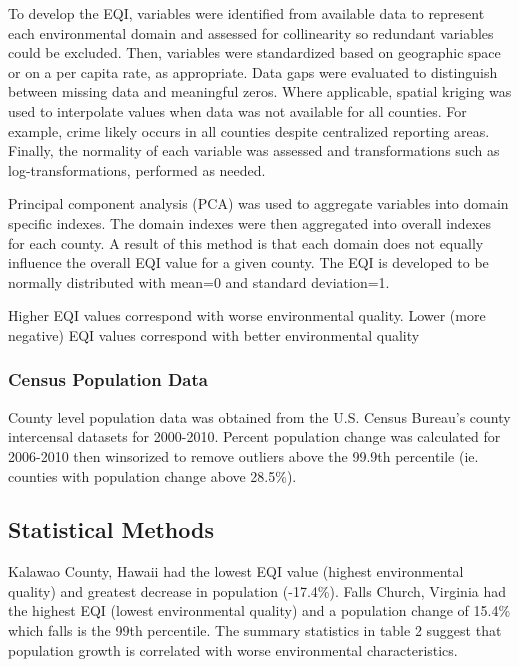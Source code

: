 \documentclass[
]{article}
\begin{document}
To develop the EQI, variables were identified from available data to
represent each environmental domain and assessed for collinearity so
redundant variables could be excluded. Then, variables were standardized
based on geographic space or on a per capita rate, as appropriate. Data
gaps were evaluated to distinguish between missing data and meaningful
zeros. Where applicable, spatial kriging was used to interpolate values
when data was not available for all counties. For example, crime likely
occurs in all counties despite centralized reporting areas. Finally, the
normality of each variable was assessed and transformations such as
log-transformations, performed as needed.

Principal component analysis (PCA) was used to aggregate variables into
domain specific indexes. The domain indexes were then aggregated into
overall indexes for each county. A result of this method is that each
domain does not equally influence the overall EQI value for a given
county. The EQI is developed to be normally distributed with mean=0 and
standard deviation=1.

Higher EQI values correspond with worse environmental quality. Lower
(more negative) EQI values correspond with better environmental quality

\hypertarget{census-population-data}{%
\subsubsection{Census Population Data}\label{census-population-data}}

County level population data was obtained from the U.S. Census Bureau's
county intercensal datasets for 2000-2010. Percent population change was
calculated for 2006-2010 then winsorized to remove outliers above the
99.9th percentile (ie. counties with population change above 28.5\%).

\hypertarget{statistical-methods}{%
\subsection{Statistical Methods}\label{statistical-methods}}

Kalawao County, Hawaii had the lowest EQI value (highest environmental
quality) and greatest decrease in population (-17.4\%). Falls Church,
Virginia had the highest EQI (lowest environmental quality) and a
population change of 15.4\% which falls is the 99th percentile. The
summary statistics in table 2 suggest that population growth is
correlated with worse environmental characteristics.
\end{document}
